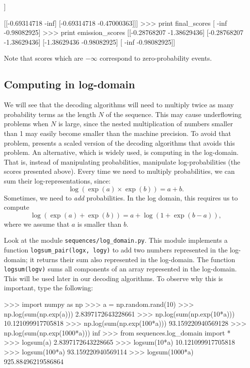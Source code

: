 \begin{exercise}
\begin{python}
 [[-0.69314718        -inf]
  [-0.69314718 -0.47000363]]

 [[-0.69314718        -inf]
  [-0.69314718 -0.47000363]]]
>>> print final_scores
[       -inf -0.98082925]
>>> print emission_scores
[[-0.28768207 -1.38629436]
 [-0.28768207 -1.38629436]
 [-1.38629436 -0.98082925]
 [       -inf -0.98082925]] 
\end{python}

Note that scores which are $-\infty$ correspond
to zero-probability events. 
\end{exercise}

\subsection{Computing in log-domain}

We will see that the decoding algorithms 
will need to multiply twice as many probability terms as 
the length $N$ of the sequence. 
This may cause underflowing problems 
when $N$ is large, since the nested multiplication of numbers smaller than 1
may easily become smaller than the machine precision. To avoid that
problem, \cite{rabiner} presents a scaled version of the decoding algorithms that avoids this problem.
An alternative, which is widely used, is computing
in the log-domain. That is, instead of 
manipulating probabilities, manipulate log-probabilities (the scores presented above). 
Every time we need to multiply probabilities, 
we can sum their log-representations, since:
\begin{equation}
\log(\exp(a) \times \exp(b)) = a+b.
\end{equation}
Sometimes, we need to \emph{add} probabilities. 
In the log domain, this requires us to compute 
\begin{equation}
\log(\exp(a) + \exp(b)) = a + \log(1 + \exp(b-a)),
\end{equation}
where we assume that $a$ is smaller than $b$.


\begin{exercise}
Look at the module {\tt sequences/log\_domain.py}. 
This module implements a function
{\tt logsum\_pair(logx, logy)} to 
add two numbers represented in the log-domain;
it returns their sum also represented in the log-domain. The function {\tt logsum(logv)} 
sums all components of an array 
represented in the log-domain. 
This will be used later in our decoding algorithms.
To observe why this is important, type the 
following:
\begin{python}
>>> import numpy as np
>>> a = np.random.rand(10)
>>> np.log(sum(np.exp(a)))
2.8397172643228661
>>> np.log(sum(np.exp(10*a)))
10.121099917705818
>>> np.log(sum(np.exp(100*a)))
93.159220940569128
>>> np.log(sum(np.exp(1000*a)))
inf
>>> from sequences.log_domain import *
>>> logsum(a)
2.8397172643228665
>>> logsum(10*a)
10.121099917705818
>>> logsum(100*a)
93.159220940569114
>>> logsum(1000*a)
925.88496219586864
\end{python}
\end{exercise}


